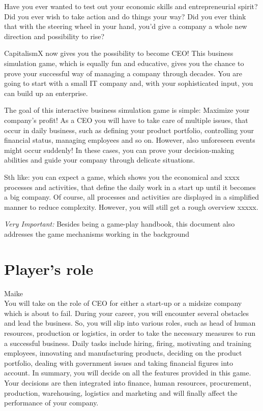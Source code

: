 \documentclass[11pt,titlepage,oneside,openany]{book}
\begin{document}
Have you ever wanted to test out your economic skills and entrepreneurial spirit? Did you ever wish to take action and do things your way? Did you ever think that with the steering wheel in your hand, you'd give a company a whole new direction and possibility to rise? 

CapitalismX now gives you the possibility to become CEO! This business simulation game, which is equally fun and educative, gives you the chance to prove your successful way of managing a company through decades. You are going to start with a small IT company and, with your sophisticated input, you can build up an enterprise.

The goal of this interactive business simulation game is simple: Maximize your company's profit! As a CEO you will have to take care of multiple issues, that occur in daily business, such as defining your product portfolio, controlling your financial status, managing employees and so on. However, also unforeseen events might occur suddenly! In these cases, you can prove your decision-making abilities and guide your company through delicate situations. 

Sth like: you can expect a game, which shows you the economical and xxxx processes and activities, that define the daily work in a start up until it becomes a big company. Of course, all processes and activities are displayed in a simplified manner to reduce complexity. However, you will still get a rough overview xxxxx.

\emph{Very Important:} Besides being a game-play handbook, this document also addresses the game mechanisms working in the background
 
\section{Player's role}
Maike\\
You will take on the role of CEO for either a start-up or a midsize company which is about to fail. During your career, you will encounter several obstacles and lead the business. So, you will slip into various roles, such as head of human resources, production or logistics, in order to take the necessary measures to run a successful business. Daily tasks include hiring, firing, motivating and training employees, innovating and manufacturing products, deciding on the product portfolio, dealing with government issues and taking financial figures into account. In summary, you will decide on all the features provided in this game. Your decisions are then integrated into finance, human resources, procurement, production, warehousing, logistics and marketing and will finally affect the performance of your company.
\end{document}
